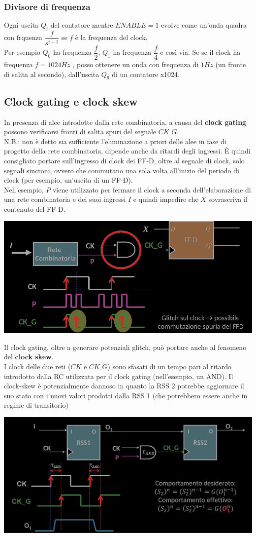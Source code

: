 \documentclass{article}
\begin{document}
\subsubsection{Divisore di frequenza}
Ogni uscita $Q_i$ del contatore mentre $ENABLE=1$ evolve come un'onda quadra con frquenza $\dfrac{f}{s^{i+1}}$ se $f$ è la frequenza del clock.\\
Per esempio $Q_0$ ha frequenza $\dfrac{f}{2}$, $Q_1$ ha frequenza $\dfrac{f}{4}$ e così via. Se se il clock ha frequenza $f= 1024 Hz$ , posso ottenere un onda con frequenza di $1Hz$ (un fronte di salita al secondo), dall’uscita $Q_9$ di un contatore x1024.
\subsection{Clock gating e clock skew}
In presenza di alee introdotte dalla rete combinatoria, a causa del \textbf{\color{cyan}clock gating} possono verificarsi fronti di salita spuri del segnale $CK\_G$.\\
N.B.: non è detto sia sufficiente l’eliminazione a priori delle alee in fase di progetto della rete combinatoria, dipende anche da ritardi degli ingressi. È quindi consigliato portare sull’ingresso di clock dei FF-D, oltre al segnale di clock, solo segnali sincroni, ovvero che commutano una sola volta all’inizio del periodo di clock (per esempio, un’uscita di un FF-D).\\
Nell’esempio, $P$ viene utilizzato per fermare il clock a seconda dell’elaborazione di una rete combinatoria e dei suoi ingressi $I$ e quindi impedire che $X$ sovrascriva il contenuto del FF-D.
\begin{center}
    \includegraphics[scale=0.35]{clock gating.png}
\end{center}
Il clock gating, oltre a generare potenziali glitch, può portare anche al fenomeno del \textbf{\color{cyan}clock skew}.\\
I clock delle due reti ($CK$ e $CK\_G$) sono sfasati di un tempo pari al ritardo introdotto dalla RC utilizzata per il clock gating (nell’esempio, un AND). Il clock-skew è potenzialmente dannoso in quanto la RSS 2 potrebbe aggiornare il suo stato con i nuovi valori prodotti dalla RSS 1 (che potrebbero essere anche in regime di transitorio)
\begin{center}
    \includegraphics[scale=0.35]{clock skew.png}
\end{center}
\end{document}
